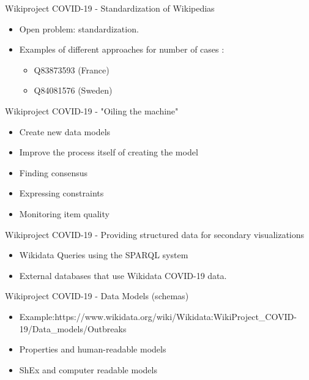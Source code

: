 \documentclass{beamer}
\begin{document}
\begin{frame}{Wikiproject COVID-19 - Standardization of Wikipedias}

\begin{itemize}
    \item Open problem: standardization. 
    \item Examples of different approaches for number of cases :
    \begin{itemize}
        \item Q83873593 (France) 
        \item Q84081576 (Sweden)
    \end{itemize}
\end{itemize}
\end{frame}



\begin{frame}{Wikiproject COVID-19 - "Oiling the machine"}
\begin{itemize}
    \item Create new data models 
    \item Improve the process itself of creating the model
    \item Finding consensus
    \item Expressing constraints
    \item Monitoring item quality
\end{itemize}
\end{frame}


\begin{frame}{Wikiproject COVID-19 - Providing structured data for secondary visualizations}
\begin{itemize}
    \item Wikidata Queries using the SPARQL system 
    \item External databases that use Wikidata COVID-19 data.
\end{itemize}
\end{frame}



\begin{frame}{Wikiproject COVID-19 - Data Models (schemas) }
\begin{itemize}
    \item Example:https://www.wikidata.org/wiki/Wikidata:WikiProject\_COVID-19/Data\_models/Outbreaks
    \item Properties and human-readable models
    \item ShEx and computer readable models
\end{itemize}
\end{frame}
\end{document}
